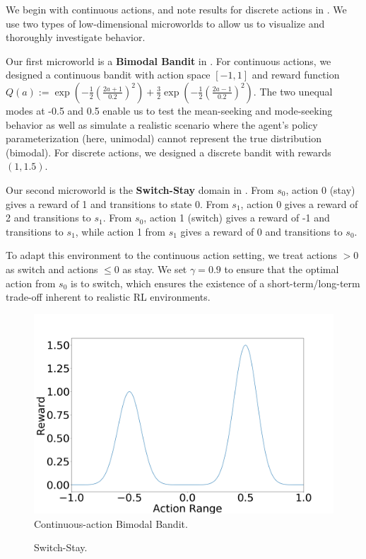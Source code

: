 \documentclass[twoside,11pt]{article}
\begin{document}
We begin with continuous actions, and note results for discrete actions in . We use two types of low-dimensional microworlds to allow us to visualize and thoroughly investigate behavior.

Our first microworld is a \textbf{Bimodal Bandit} in . For continuous actions, we designed a continuous bandit with action space $[-1, 1]$ and reward function $Q(a) := \exp( -\tfrac{1}{2} (\tfrac{2 a + 1}{0.2})^2 ) + \tfrac{3}{2} \exp(-\tfrac{1}{2} (\tfrac{2 a - 1}{0.2})^2)$. The two unequal modes at -0.5 and 0.5 enable us to test the mean-seeking and mode-seeking behavior as well as simulate a realistic scenario where the agent's policy parameterization (here, unimodal) cannot represent the true distribution (bimodal). For discrete actions, we designed a discrete bandit with rewards $(1, 1.5)$. 

Our second microworld is the \textbf{Switch-Stay} domain in . From $s_0$, action $0$ (stay) gives a reward of 1 and transitions to state $0$. From $s_1$, action 0 gives a reward of 2 and transitions to $s_1$. From $s_0$, action 1 (switch) gives a reward of -1 and transitions to $s_1$, while action 1 from $s_1$ gives a reward of 0 and transitions to $s_0$. 

To adapt this environment to the continuous action setting, we treat actions $> 0$ as switch and actions $\leq 0$ as stay.  We set $\gamma = 0.9$ to ensure that the optimal action from $s_0$ is to switch, which ensures the existence of a short-term/long-term trade-off inherent to realistic RL environments. 

\begin{figure}[!htb]
    \centering
    \includegraphics[width=0.5\linewidth]{figs/bandit/bimodal-bandit.png}
    \caption{Continuous-action Bimodal Bandit.}
    \label{fig:bimodal-bandit}
\end{figure}


\begin{figure}[!htb]
  \hspace*{10em}
    \caption{Switch-Stay.}
    \label{fig:switch-stay}
\end{figure}%
\end{document}

